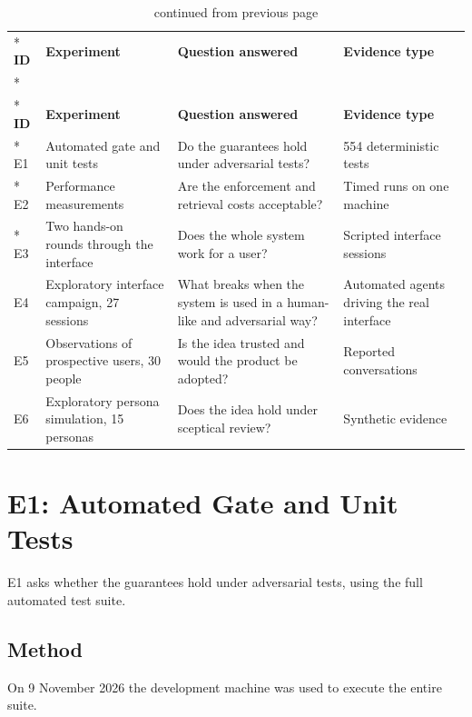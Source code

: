 \documentclass{FastFyp}
\begin{document}
{
\begin{longtable}{|p{0.9cm}|p{4.2cm}|p{4.3cm}|p{3.8cm}|}
\caption{The experiments reported in this chapter.}\label{tab:experiments}\\*
\hline
\textbf{ID} & \textbf{Experiment} & \textbf{Question answered} & \textbf{Evidence type} \\*
\hline
\endfirsthead
\caption[]{continued from previous page}\\*
\hline
\textbf{ID} & \textbf{Experiment} & \textbf{Question answered} & \textbf{Evidence type} \\*
\hline
\endhead
\hline
E1 & Automated gate and unit tests & Do the guarantees hold under adversarial tests? & 554 deterministic tests \\*
\hline
E2 & Performance measurements & Are the enforcement and retrieval costs acceptable? & Timed runs on one machine \\*
\hline
E3 & Two hands-on rounds through the interface & Does the whole system work for a user? & Scripted interface sessions \\
\hline
E4 & Exploratory interface campaign, 27 sessions & What breaks when the system is used in a human-like and adversarial way? & Automated agents driving the real interface \\
\hline
E5 & Observations of prospective users, 30 people & Is the idea trusted and would the product be adopted? & Reported conversations \\
\hline
E6 & Exploratory persona simulation, 15 personas & Does the idea hold under sceptical review? & Synthetic evidence \\
\hline
\end{longtable}
}

\section{E1: Automated Gate and Unit Tests}
E1 asks whether the guarantees hold under adversarial tests, using the full automated test suite.

\subsection{Method}
On 9 November 2026 the development machine was used to execute the entire suite.
\end{document}
